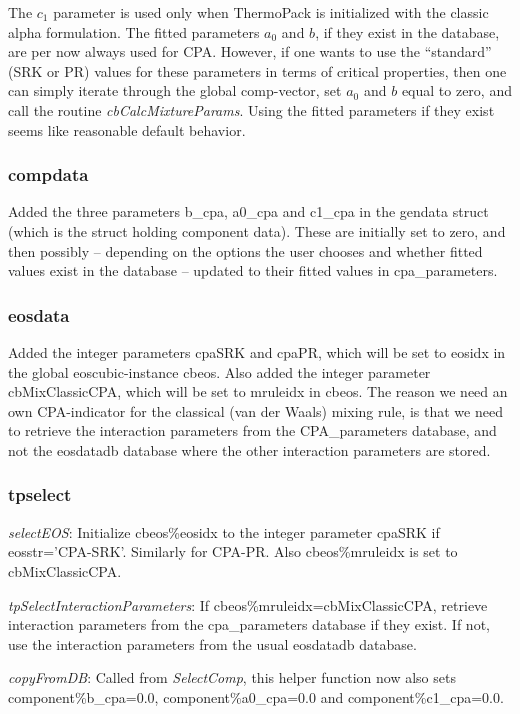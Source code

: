 \documentclass[english]{../thermomemo/thermomemo}
\begin{document}
The $c_1$ parameter is used only when ThermoPack is initialized with the classic alpha formulation. The fitted parameters $a_0$ and $b$, if they exist in the database, are per now always used for CPA. However, if one wants to use the ``standard'' (SRK or PR) values for these parameters in terms of critical properties, then one can simply iterate through the global comp-vector, set $a_0$ and $b$ equal to zero, and call the routine \textit{cbCalcMixtureParams}. Using the fitted parameters if they exist seems like reasonable default behavior.

\subsubsection*{compdata}
Added the three parameters b\_cpa, a0\_cpa and c1\_cpa in the gendata struct (which is the struct holding component data). These are initially set to zero, and then possibly -- depending on the options the user chooses and whether fitted values exist in the database -- updated to their fitted values in cpa\_parameters.

\subsubsection*{eosdata}
Added the integer parameters cpaSRK and cpaPR, which will be set to eosidx in the global eoscubic-instance cbeos. Also added the integer parameter cbMixClassicCPA, which will be set to mruleidx in cbeos. The reason we need an own CPA-indicator for the classical (van der Waals) mixing rule, is that we need to retrieve the interaction parameters from the CPA\_parameters database, and not the eosdatadb database where the other interaction parameters are stored.

\subsubsection*{tpselect}
\textit{selectEOS}: Initialize cbeos\%eosidx to the integer parameter cpaSRK if eosstr='CPA-SRK'. Similarly for CPA-PR. Also cbeos\%mruleidx is set to cbMixClassicCPA.

\textit{tpSelectInteractionParameters}: If cbeos\%mruleidx=cbMixClassicCPA, retrieve interaction parameters from the cpa\_parameters database if they exist. If not, use the interaction parameters from the usual eosdatadb database.

\textit{copyFromDB}: Called from \textit{SelectComp}, this helper function now also sets component\%b\_cpa=0.0, component\%a0\_cpa=0.0 and component\%c1\_cpa=0.0.
\end{document}

